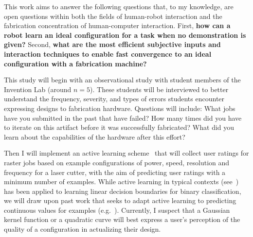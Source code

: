 \documentclass[12pt]{article}
\begin{document}

This work aims to answer the following questions that, to my knowledge, are open questions within both the fields of human-robot interaction and the fabrication concentration of human-computer interaction.
First, \textbf{how can a robot learn an ideal configuration for a task when no demonstration is given?}
Second, \textbf{what are the most efficient subjective inputs and interaction techniques to enable fast convergence to an ideal configuration with a fabrication machine?}

This study will begin with an observational study with student members of the Invention Lab (around $n=5$).
These students will be interviewed to better understand the frequency, severity, and types of errors students encounter expressing designs to fabrication hardware.
Questions will include:
What jobs have you submitted in the past that have failed?
How many times did you have to iterate on this artifact before it was successfully fabricated?
What did you learn about the capabilities of the hardware after this effort?

Then I will implement an active learning scheme~\cite{settles_active_2010} that will collect user ratings for raster jobs based on example configurations of power, speed, resolution and frequency for a laser cutter, with the aim of predicting user ratings with a minimum number of examples.
While active learning in typical contexts (see~\cite{settles_active_2010}) has been applied to learning linear decision boundaries for binary classification, we will draw upon past work that seeks to adapt active learning to predicting continuous values for examples (e.g.~\cite{sugiyama_active_2008}).
Currently, I suspect that a Gaussian kernel function or a quadratic curve will best express a user's perception of the quality of a configuration in actualizing their design.
\end{document}
